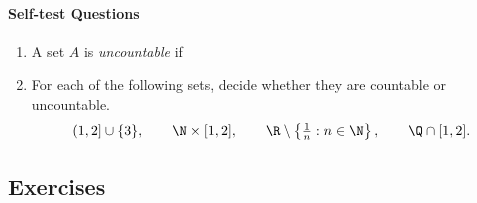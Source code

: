 \paragraph{Self-test Questions}

\begin{enumerate}
  \item A set $A$ is \emph{uncountable} if \underline{\phantom{there exists no injection $f:A\to\N$\qquad\qquad}}
  
  \item For each of the following sets, decide whether they are countable or uncountable.
  \[(1,2]\cup\{3\},\qquad \N\times[1,2],\qquad\R\setminus\left\{\tfrac 1n:n\in\N\right\},\qquad \Q\cap[1,2].\] 
\end{enumerate}

\subsection*{Exercises}


